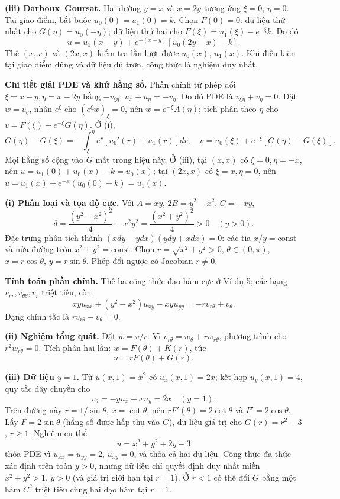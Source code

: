 \textbf{(iii) Darboux--Goursat.} Hai đường $y=x$ và $x=2y$ tương ứng $\xi=0$, $\eta=0$. Tại giao điểm, bắt buộc $u_0(0)=u_1(0)=k$. Chọn $F(0)=0$: dữ liệu thứ nhất cho $G(\eta)=u_0(-\eta)$; dữ liệu thứ hai cho $F(\xi)=u_1(\xi)-e^{-\xi}k$. Do đó
\[\boxed{u=u_1(x-y)+e^{-(x-y)}[u_0(2y-x)-k].}\]
Thế $(x,x)$ và $(2x,x)$ kiểm tra lần lượt được $u_0(x)$, $u_1(x)$. Khi điều kiện tại giao điểm đúng và dữ liệu đủ trơn, công thức là nghiệm duy nhất.

\textbf{Chi tiết giải PDE và khử hằng số.} Phần chính từ phép đổi $\xi=x-y,\eta=x-2y$ bằng $-v_{\xi\eta}$; $u_x+u_y=-v_\eta$. Do đó PDE là $v_{\xi\eta}+v_\eta=0$. Đặt $w=v_\eta$, nhân $e^\xi$ cho $(e^\xi w)_\xi=0$, nên $w=e^{-\xi}A(\eta)$; tích phân theo $\eta$ cho $v=F(\xi)+e^{-\xi}G(\eta)$. Ở (i),
\[G(\eta)-G(\xi)=-\int_\xi^\eta e^r[u_0'(r)+u_1(r)]dr,\quad
v=u_0(\xi)+e^{-\xi}[G(\eta)-G(\xi)].\]
Mọi hằng số cộng vào $G$ mất trong hiệu này. Ở (iii), tại $(x,x)$ có $\xi=0,\eta=-x$, nên $u=u_1(0)+u_0(x)-k=u_0(x)$; tại $(2x,x)$ có $\xi=x,\eta=0$, nên $u=u_1(x)+e^{-x}(u_0(0)-k)=u_1(x)$.

\textbf{(i) Phân loại và tọa độ cực.} Với $A=xy$, $2B=y^2-x^2$, $C=-xy$,
\[\delta=\frac{(y^2-x^2)^2}{4}+x^2y^2=\frac{(x^2+y^2)^2}{4}>0\quad(y>0).\]
Đặc trưng phân tích thành $(xdy-ydx)(ydy+xdx)=0$: các tia $x/y=\mathrm{const}$ và nửa đường tròn $x^2+y^2=\mathrm{const}$. Chọn $r=\sqrt{x^2+y^2}>0$, $\theta\in(0,\pi)$, $x=r\cos\theta$, $y=r\sin\theta$. Phép đổi ngược có Jacobian $r\ne0$.

\textbf{Tính toán phần chính.} Thế ba công thức đạo hàm cực ở Ví dụ 5; các hạng $v_{rr},v_{\theta\theta},v_r$ triệt tiêu, còn
\[xyu_{xx}+(y^2-x^2)u_{xy}-xyu_{yy}=-r v_{r\theta}+v_\theta.\]
Dạng chính tắc là $r v_{r\theta}-v_\theta=0$.

\textbf{(ii) Nghiệm tổng quát.} Đặt $w=v/r$. Vì $v_{r\theta}=w_\theta+r w_{r\theta}$, phương trình cho $r^2w_{r\theta}=0$. Tích phân hai lần: $w=F(\theta)+K(r)$, tức
\[\boxed{u=rF(\theta)+G(r).}\]

\textbf{(iii) Dữ liệu $y=1$.} Từ $u(x,1)=x^2$ có $u_x(x,1)=2x$; kết hợp $u_y(x,1)=4$, quy tắc dây chuyền cho
\[v_\theta=-y u_x+xu_y=2x\quad(y=1).\]
Trên đường này $r=1/\sin\theta$, $x=\cot\theta$, nên $rF'(\theta)=2\cot\theta$ và $F'=2\cos\theta$. Lấy $F=2\sin\theta$ (hằng số được hấp thụ vào $G$), dữ liệu giá trị cho $G(r)=r^2-3$, $r\ge1$. Nghiệm cụ thể
\[\boxed{u=x^2+y^2+2y-3}\]
thỏa PDE vì $u_{xx}=u_{yy}=2$, $u_{xy}=0$, và thỏa cả hai dữ liệu. Công thức đa thức xác định trên toàn $y>0$, nhưng dữ liệu chỉ quyết định duy nhất miền $x^2+y^2>1$, $y>0$ (và giá trị giới hạn tại $r=1$). Ở $r<1$ có thể đổi $G$ bằng một hàm $C^2$ triệt tiêu cùng hai đạo hàm tại $r=1$.

